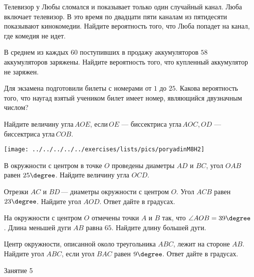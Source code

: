 \begin{homework}[number=2]
	\begin{listofex}
		\item Телевизор у Любы сломался и показывает только один случайный канал. Люба включает телевизор. В это время по двадцати пяти каналам из пятидесяти показывают кинокомедии. Найдите вероятность того, что Люба попадет на канал, где комедия не идет.
		\item В среднем из каждых \( 60 \) поступивших в продажу аккумуляторов \( 58 \) аккумуляторов заряжены. Найдите вероятность того, что купленный аккумулятор не заряжен.
		\item Для экзамена подготовили билеты с номерами от \( 1 \) до \( 25 \). Какова вероятность того, что наугад взятый учеником билет имеет номер, являющийся двузначным числом?
		\item 
		\begin{minipage}[t]{\bodywidth}
		 Найдите величину угла \( AOE \), если \( OE \) --- биссектриса угла \( AOC \), \( OD \) --- биссектриса угла \( COB \).
		\end{minipage}
		\hspace{0.02\linewidth}
		\begin{minipage}[t]{\picwidth}
			\texttt{[image: ../../../../../exercises/lists/pics/poryadinM8H2]}
		\end{minipage}	
		\item В окружности с центром в точке \( O \) проведены диаметры \( AD \) и \( BC \), угол \( OAB \) равен \( 25\degree \). Найдите величину угла \( OCD \).
		\item Отрезки \( AC \) и \( BD \) --- диаметры окружности с центром \( O \). Угол \( ACB \) равен \( 23\degree \). Найдите угол \( AOD \). Ответ дайте в градусах.
		\item На окружности с центром \( O \) отмечены точки \( A \) и \( B \) так, что \( \angle AOB=39\degree \). Длина меньшей дуги \( AB \) равна \( 65 \). Найдите длину большей дуги.
		\item Центр окружности, описанной около треугольника \( ABC \), лежит на стороне \( AB \). Найдите угол \( ABC \), если угол \( BAC \) равен \( 9\degree \). Ответ дайте в градусах.
	\end{listofex}
\end{homework}

\begin{class}[number=5]
	\begin{listofex}
		\item Занятие 5
	\end{listofex}
\end{class}

